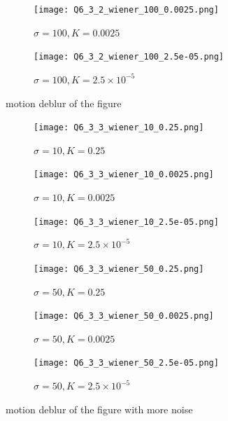 \documentclass[
	12pt, %
]{style/fphw}
\begin{document}
\begin{figure}[H]
			\hfill
			\begin{subfigure}[b]{.3\textwidth}
				\centering
				\texttt{[image: Q6\_3\_2\_wiener\_100\_0.0025.png]}
				\caption{$\sigma=100, K=0.0025$}
				\label{Q6_3_2_wiener_100_0.0025}
			\end{subfigure}
			\hfill
			\begin{subfigure}[b]{.3\textwidth}
				\centering
				\texttt{[image: Q6\_3\_2\_wiener\_100\_2.5e-05.png]}
				\caption{$\sigma=100, K=2.5 \times 10^{-5}$}
				\label{Q6_3_2_wiener_100_2.5e-05}
			\end{subfigure}
		\caption{motion deblur of the figure}
		\label{motion deblur of the figure}	
	\end{figure}

	\begin{figure}[H]
		\centering
			\begin{subfigure}[b]{.3\textwidth}
				\centering
				\texttt{[image: Q6\_3\_3\_wiener\_10\_0.25.png]}
				\caption{$\sigma=10, K=0.25$}
				\label{Q6_3_3_wiener_10_0.25}
			\end{subfigure}
			\hfill
			\begin{subfigure}[b]{.3\textwidth}
				\centering
				\texttt{[image: Q6\_3\_3\_wiener\_10\_0.0025.png]}
				\caption{$\sigma=10, K=0.0025$}
				\label{Q6_3_3_wiener_10_0.0025}
			\end{subfigure}
			\hfill
			\begin{subfigure}[b]{.3\textwidth}
				\centering
				\texttt{[image: Q6\_3\_3\_wiener\_10\_2.5e-05.png]}
				\caption{$\sigma=10, K=2.5 \times 10^{-5}$}
				\label{Q6_3_3_wiener_10_2.5e-05}
			\end{subfigure}
		\vfill
			\begin{subfigure}[b]{.3\textwidth}
				\centering
				\texttt{[image: Q6\_3\_3\_wiener\_50\_0.25.png]}
				\caption{$\sigma=50, K=0.25$}
				\label{Q6_3_3_wiener_50_0.25}
			\end{subfigure}
			\hfill
			\begin{subfigure}[b]{.3\textwidth}
				\centering
				\texttt{[image: Q6\_3\_3\_wiener\_50\_0.0025.png]}
				\caption{$\sigma=50, K=0.0025$}
				\label{Q6_3_3_wiener_50_0.0025}
			\end{subfigure}
			\hfill
			\begin{subfigure}[b]{.3\textwidth}
				\centering
				\texttt{[image: Q6\_3\_3\_wiener\_50\_2.5e-05.png]}
				\caption{$\sigma=50, K=2.5 \times 10^{-5}$}
				\label{Q6_3_3_wiener_50_2.5e-05}
			\end{subfigure}
		
		\caption{motion deblur of the figure with more noise}
		\label{motion deblur of the figure with more noise}	
	\end{figure}
\end{document}
